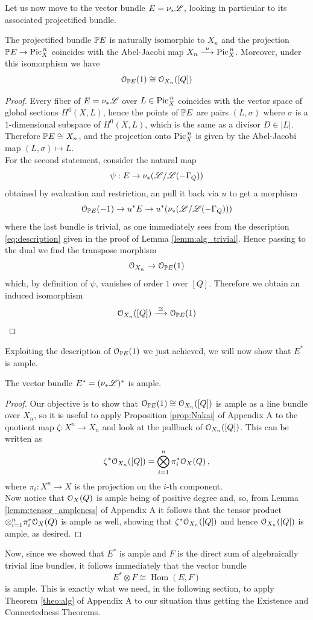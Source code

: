 	Let us now move to the vector bundle $E=\nu_{*} \mathscr{L}$, looking in particular to its associated projectified bundle.
	\begin{prop}
		The projectified bundle $\mathbb{P} E$ is naturally isomorphic to $X_n$ and the projection $\mathbb{P} E \to \operatorname{Pic}^{\,n}_X$ coincides with the Abel-Jacobi map $X_n \overset{u}\longrightarrow \operatorname{Pic}^{\,n}_X$. Moreover, under this isomorphism we have
		$$ \mathcal{O}_{\mathbb{P} E}(1) \cong \mathcal{O}_{X_n}([Q]) $$
	\end{prop}
	\begin{proof}
		Every fiber of $E=\nu_{*}\mathscr{L}$ over $L\in \operatorname{Pic}^{\,n}_X$ coincides with the vector space of global sections $H^0(X,L)$, hence the points of $\mathbb{P} E$ are pairs $(L,\sigma)$ where $\sigma$ is a $1$-dimensional subspace of $H^0(X,L)$, which is the same as a divisor $D\in |L|$. Therefore $\mathbb{P} E \cong X_n$, and the projection onto $\operatorname{Pic}^{\,n}_X$ is given by the Abel-Jacobi map $(L,\sigma) \mapsto L$.\\

		For the second statement, consider the natural map
		$$ \psi: E \to \nu_*(\mathscr{L}/\mathscr{L}(-\Gamma_Q)) $$
		obtained by evaluation and restriction, an pull it back via $u$ to get a morphism
		$$ \mathcal{O}_{\mathbb{P} E}(-1)\to u^* E \to u^*(\nu_*(\mathscr{L}/\mathscr{L}(-\Gamma_Q))) $$
		where the last bundle is trivial, as one immediately sees from the description \ref{eq:description} given in the proof of Lemma \ref{lemm:alg_trivial}. Hence passing to the dual we find the transpose morphism
		$$ \mathcal{O}_{X_n} \to \mathcal{O}_{\mathbb{P} E}(1) $$
		which, by definition of $\psi$, vanishes of order $1$ over $[Q]$. Therefore we obtain an induced isomorphism
		$$\mathcal{O}_{X_n}([Q]) \overset{\cong}\longrightarrow \mathcal{O}_{\mathbb{P} E}(1)$$ 
	\end{proof}
	Exploiting the description of $\mathcal{O}_{\mathbb{P} E}(1)$ we just achieved, we will now show that $E^*$ is ample.
	\begin{prop}
		The vector bundle $E^* = (\nu_{*}\mathscr{L})^*$ is ample.
	\end{prop}
	\begin{proof}
		Our objective is to show that $\mathcal{O}_{\mathbb{P} E}(1)\cong \mathcal{O}_{X_n}([Q])$ is ample as a line bundle over $X_n$, so it is useful to apply Proposition \ref{prop:Nakai} of Appendix A to the quotient map $\zeta:X^n\to X_n$ and look at the pullback of $\mathcal{O}_{X_n}([Q])$. This can be written as
		$$ \zeta^* \mathcal{O}_{X_n}([Q]) = \bigotimes_{i=1}^n \pi_i^* \mathcal{O}_X(Q)\,, $$
		where $\pi_i:X^n\to X$ is the projection on the $i$-th component.\\
		Now notice that $\mathcal{O}_X(Q)$ is ample being of positive degree and, so, from Lemma \ref{lemm:tensor_ampleness} of Appendix A it follows that the tensor product $\otimes_{i=1}^n \pi_i^* \mathcal{O}_X(Q)$ is ample as well, showing that $\zeta^* \mathcal{O}_{X_n}([Q])$ and hence $\mathcal{O}_{X_n}([Q])$ is ample, as desired.
	\end{proof}
	Now, since we showed that $E^*$ is ample and $F$ is the direct sum of algebraically trivial line bundles, it follows immediately that the vector bundle
	$$ E^*\otimes F \cong \operatorname{Hom}(E,F) $$
	is ample. This is exactly what we need, in the following section, to apply Theorem \ref{theo:alg} of Appendix A to our situation thus getting the Existence and Connectedness Theorems.

